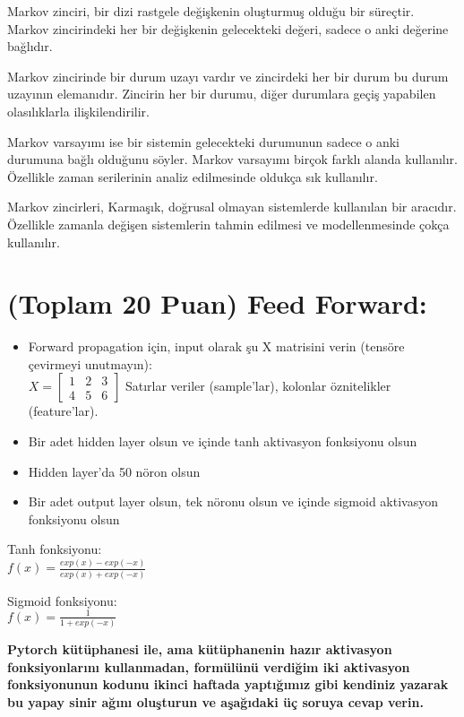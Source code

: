 \documentclass[11pt]{article}
\begin{document}
Markov zinciri, bir dizi rastgele değişkenin oluşturmuş olduğu bir süreçtir. Markov zincirindeki her bir değişkenin gelecekteki değeri, sadece o anki değerine bağlıdır.

Markov zincirinde bir durum uzayı vardır ve zincirdeki her bir durum bu durum uzayının elemanıdır. Zincirin her bir durumu, diğer durumlara geçiş yapabilen olasılıklarla ilişkilendirilir.

Markov varsayımı ise bir sistemin gelecekteki durumunun sadece o anki durumuna bağlı olduğunu söyler. Markov varsayımı birçok farklı alanda kullanılır. Özellikle zaman serilerinin analiz edilmesinde oldukça sık kullanılır.

Markov zincirleri, Karmaşık, doğrusal olmayan sistemlerde kullanılan bir aracıdır. Özellikle zamanla değişen sistemlerin tahmin edilmesi ve modellenmesinde çokça kullanılır.

\section{(Toplam 20 Puan) Feed Forward:}
 
\begin{itemize}
    \item Forward propagation için, input olarak şu X matrisini verin (tensöre çevirmeyi unutmayın):\\
    $X = \begin{bmatrix}
        1 & 2 & 3\\
        4 & 5 & 6
        \end{bmatrix}$
    Satırlar veriler (sample'lar), kolonlar öznitelikler (feature'lar).
    \item Bir adet hidden layer olsun ve içinde tanh aktivasyon fonksiyonu olsun
    \item Hidden layer'da 50 nöron olsun
    \item Bir adet output layer olsun, tek nöronu olsun ve içinde sigmoid aktivasyon fonksiyonu olsun
\end{itemize}

Tanh fonksiyonu:\\
$f(x) = \frac{exp(x) - exp(-x)}{exp(x) + exp(-x)}$
\vspace{.2in}

Sigmoid fonksiyonu:\\
$f(x) = \frac{1}{1 + exp(-x)}$

\vspace{.2in}
 \textbf{Pytorch kütüphanesi ile, ama kütüphanenin hazır aktivasyon fonksiyonlarını kullanmadan, formülünü verdiğim iki aktivasyon fonksiyonunun kodunu ikinci haftada yaptığımız gibi kendiniz yazarak bu yapay sinir ağını oluşturun ve aşağıdaki üç soruya cevap verin.}
 
\end{document}
